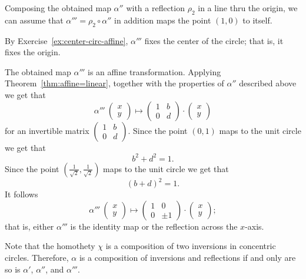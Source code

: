 Composing the obtained map $\alpha''$ with a reflection $\rho_2$ in a line thru the origin,
we can assume that $\alpha'''=\rho_2\circ\alpha''$ in addition maps the point $(1,0)$ to itself.

By Exercise~\ref{ex:center-circ-affine},
$\alpha'''$ fixes the center of the circle;
that is, it fixes the origin.

The obtained map $\alpha'''$ is an affine transformation.
Applying Theorem~\ref{thm:affine=linear}, together with the properties of $\alpha''$ described above we get that
\[\alpha'''\:\left(\begin{smallmatrix}
x\\ y
\end{smallmatrix} \right)
  \mapsto
  \left(\begin{smallmatrix}
1&b\\ 0&d
\end{smallmatrix} \right)
  \cdot
  \left(\begin{smallmatrix}
x\\ y
\end{smallmatrix} \right)
\]
for an invertible matrix $\left(\begin{smallmatrix}
1&b\\ 0&d
\end{smallmatrix} \right)$.
Since the point $(0,1)$ maps to the unit circle we get that 
\[b^2+d^2=1.\]
Since the point $(\tfrac1{\sqrt{2}},\tfrac1{\sqrt{2}})$ maps to the unit circle we get that 
\[(b+d)^2=1.\]
It follows 
\[\alpha'''\:\left(\begin{smallmatrix}
x\\ y
\end{smallmatrix} \right)
  \mapsto
  \left(\begin{smallmatrix}
1&0\\ 0&\pm1
\end{smallmatrix} \right)
\cdot
\left(\begin{smallmatrix}
x
\\ 
y
\end{smallmatrix} \right);
\]
that is, either $\alpha'''$ is the identity map or the reflection across the $x$-axis.

Note that the homothety $\chi$ is a composition of two inversions in concentric circles.
Therefore, $\alpha$ is a composition of inversions and reflections if and only are so is $\alpha'$, $\alpha''$, and $\alpha'''$.

























